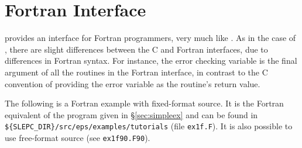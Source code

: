 \section{Fortran Interface}
\label{sec:fortran}

	\slepc provides an interface for Fortran programmers, very much like \petsc. As in the case of \petsc, there are slight differences between the C and Fortran \slepc interfaces, due to differences in Fortran syntax. For instance, the error checking variable is the final argument of all the routines in the Fortran interface, in contrast to the C convention of providing the error variable as the routine's return value.

	The following is a Fortran example with fixed-format source. It is the Fortran equivalent of the program given in \S\ref{sec:simpleex} and can be found in \Verb!${SLEPC_DIR}/src/eps/examples/tutorials! (file \texttt{ex1f.F}). It is also possible to use free-format source (see \texttt{ex1f90.F90}).

%
%
%

